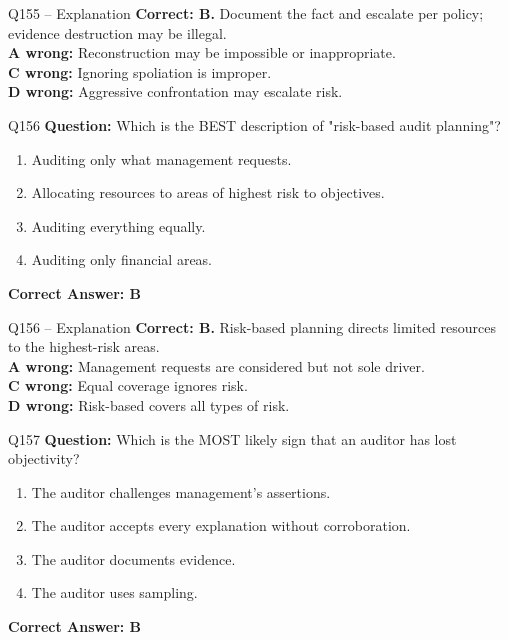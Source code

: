 \documentclass[aspectratio=169,10pt]{beamer}
\begin{document}
	\begin{frame}[t]{Q155 -- Explanation}
		\small
		\textbf{Correct: B.} Document the fact and escalate per policy; evidence destruction may be illegal. \\[4pt]
		\textbf{A wrong:} Reconstruction may be impossible or inappropriate. \\[2pt]
		\textbf{C wrong:} Ignoring spoliation is improper. \\[2pt]
		\textbf{D wrong:} Aggressive confrontation may escalate risk.
	\end{frame}
	
	\begin{frame}[t]{Q156}
		\small
		\textbf{Question:} Which is the BEST description of "risk-based audit planning"?
		\begin{enumerate}[label=\Alph*.,itemsep=1pt,topsep=2pt]
			\item Auditing only what management requests.
			\item Allocating resources to areas of highest risk to objectives.
			\item Auditing everything equally.
			\item Auditing only financial areas.
		\end{enumerate}
		\vspace{4pt}
		\textbf{Correct Answer: B}
	\end{frame}
	
	\begin{frame}[t]{Q156 -- Explanation}
		\small
		\textbf{Correct: B.} Risk-based planning directs limited resources to the highest-risk areas. \\[4pt]
		\textbf{A wrong:} Management requests are considered but not sole driver. \\[2pt]
		\textbf{C wrong:} Equal coverage ignores risk. \\[2pt]
		\textbf{D wrong:} Risk-based covers all types of risk.
	\end{frame}
	
	\begin{frame}[t]{Q157}
		\small
		\textbf{Question:} Which is the MOST likely sign that an auditor has lost objectivity?
		\begin{enumerate}[label=\Alph*.,itemsep=1pt,topsep=2pt]
			\item The auditor challenges management's assertions.
			\item The auditor accepts every explanation without corroboration.
			\item The auditor documents evidence.
			\item The auditor uses sampling.
		\end{enumerate}
		\vspace{4pt}
		\textbf{Correct Answer: B}
	\end{frame}
	
\end{document}

